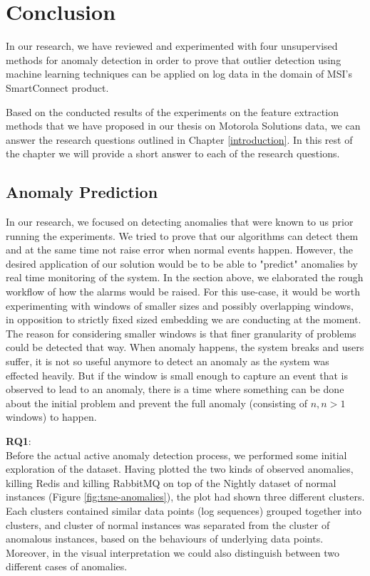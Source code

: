 \section{Conclusion}

In our research, we have reviewed and experimented with four unsupervised methods for anomaly detection in order to prove that outlier detection using machine learning techniques can be applied on log data in the domain of MSI's SmartConnect product.

Based on the conducted results of the experiments on the feature extraction methods that we have proposed in our thesis on Motorola Solutions data, we can answer the research questions outlined in Chapter \ref{introduction}. In this rest of the chapter we will provide a short answer to each of the research questions. \\

\subsection{Anomaly Prediction}
In our research, we focused on detecting anomalies that were known to us prior running the experiments. We tried to prove that our algorithms can detect them and at the same time not raise error when normal events happen. However, the desired application of our solution would be to be able to "predict" anomalies by real time monitoring of the system. In the section above, we elaborated the rough workflow of how the alarms would be raised. For this use-case, it would be worth experimenting with windows of smaller sizes and possibly overlapping windows, in opposition to strictly fixed sized embedding we are conducting at the moment. The reason for considering smaller windows is that finer granularity of problems could be detected that way. When anomaly happens, the system breaks and users suffer, it is not so useful anymore to detect an anomaly as the system was effected heavily. But if the window is small enough to capture an event that is observed to lead to an anomaly, there is a time where something can be done about the initial problem and prevent the full anomaly (consisting of $n, n > 1$ windows) to happen.

\textbf{RQ1}: \textit{\RQFirst}\\

Before the actual active anomaly detection process, we performed some initial exploration of the dataset. Having plotted the two kinds of observed anomalies, killing Redis and killing RabbitMQ on top of the Nightly dataset of normal instances (Figure \ref{fig:tsne-anomalies}), the plot had shown three different clusters. Each clusters contained similar data points (log sequences) grouped together into clusters, and cluster of normal instances was separated from the cluster of anomalous instances, based on the behaviours of underlying data points. Moreover, in the visual interpretation we could also distinguish between two different cases of anomalies.

